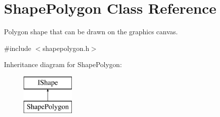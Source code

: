 \hypertarget{class_shape_polygon}{}\section{Shape\+Polygon Class Reference}
\label{class_shape_polygon}


Polygon shape that can be drawn on the graphics canvas.  




{\ttfamily \#include $<$shapepolygon.\+h$>$}

Inheritance diagram for Shape\+Polygon\+:\begin{figure}[H]
\begin{center}
\leavevmode
\includegraphics[height=2.000000cm]{class_shape_polygon}
\end{center}
\end{figure}
